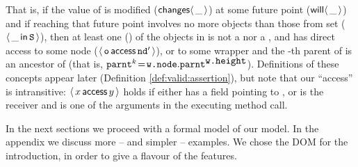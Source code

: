 \noindent
That is, if the value of  is modified
(${\mathsf{changes}}\langle\,\_\,\rangle$) at some future point (${\mathsf{will}}\langle \,\_\,\rangle$) and if reaching
that future point involves no more objects than those from set 
(\ie ${\langle\, \_\, \mathsf{in}\, {\mbox{\tt{S}}}\, \rangle}$), then at least one () of the
objects in  is not a  nor a ,
and  has direct access to some node
($\langle\, {\mbox{\tt{o}}}\, \mathsf{access}\, {\mbox{\tt{nd}}}'\, \rangle$), or to some wrapper  and
the -th parent of  is an ancestor of 
(that is,
${\mbox{\tt{parnt}}}^k\!=\!{\mbox{\tt{w.node}}}.{\mbox{\tt{parnt}}}^{{\mbox{\tt{w.height}}}}$).
Definitions of these concepts appear later
(Definition \ref{def:valid:assertion}), but note that our ``access''
is intransitive: $\langle\, x\, \mathsf{access}\, y\, \rangle$ holds if either  has a field
pointing to , or  is the receiver and  is one of
the arguments in the executing method call.
 
In the next sections we proceed with a formal model of our model. In the appendix we discuss more -- and simpler -- examples.
We chose the DOM for the introduction, in order to give a flavour of the \Chainmail features.
 
